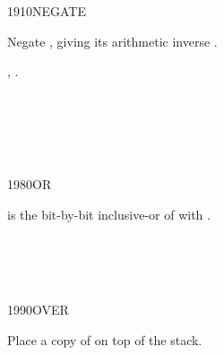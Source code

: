 \begin{worddef}{1910}{NEGATE}
\item {}

	Negate , giving its arithmetic inverse .

\see {},
	.

	\begin{testing} %
		 \\
		 \\
		 \\
		 \\
	\end{testing}
\end{worddef}


\begin{worddef}{1980}{OR}
\item {}

	 is the bit-by-bit inclusive-or of  with
	.

	\begin{testing} %
		 \\
		 \\
		 \\
	\end{testing}
\end{worddef}


\begin{worddef}{1990}{OVER}
\item {}

	Place a copy of  on top of the stack.

	\begin{testing} %
	\end{testing}
\end{worddef}


